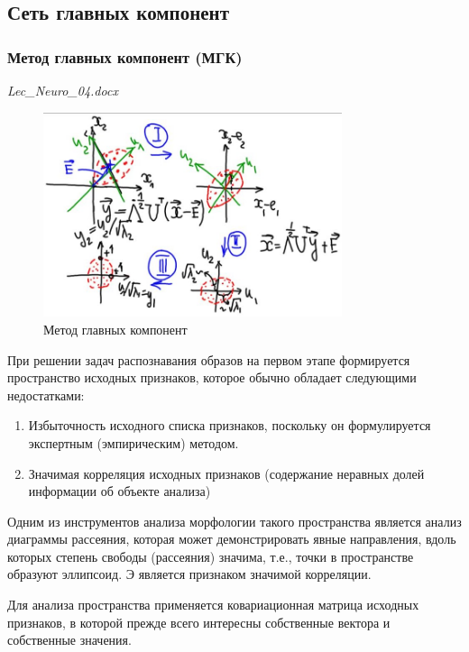 \documentclass{article}
\numberwithin{equation}{subsection}
\begin{document}
\subsection{Сеть главных компонент}

\subsubsection{Метод главных компонент (МГК)}

\begin{myquote}
    \textit{Lec\_Neuro\_04.docx}
\end{myquote}

\begin{figure}[htbp]
    \centering
    \includegraphics[height=6cm]{hyperflat_11_1.jpeg}
    \caption{Метод главных компонент}
    \label{hyperflat_11_1}
\end{figure}

При решении задач распознавания образов на первом этапе формируется пространство 
исходных признаков, которое обычно обладает  следующими недостатками:

\begin{enumerate}
    \item Избыточность исходного списка признаков, поскольку он формулируется экспертным 
    (эмпирическим) методом.
    \item Значимая корреляция исходных признаков (содержание неравных долей информации
    об объекте анализа)
\end{enumerate}

Одним из инструментов анализа морфологии такого пространства является анализ диаграммы рассеяния,
которая может демонстрировать явные направления, вдоль которых степень свободы (рассеяния)
значима, т.е., точки в пространстве образуют эллипсоид. Э является признаком значимой корреляции.

Для анализа пространства применяется ковариационная матрица исходных признаков, в которой 
прежде всего интересны собственные вектора и собственные значения.
\end{document}
